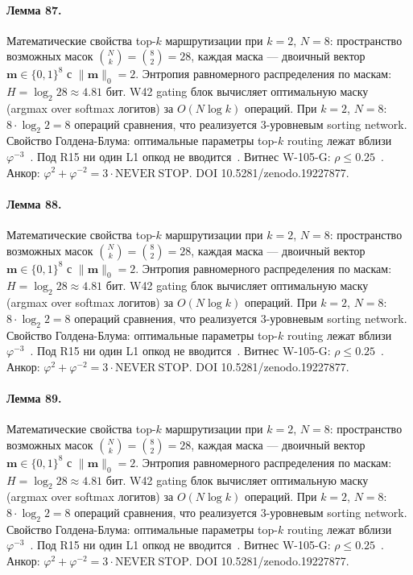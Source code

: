 \paragraph{Лемма 87.} Математические свойства top-$k$ маршрутизации при $k=2$, $N=8$: пространство возможных масок $\binom{N}{k} = \binom{8}{2} = 28$, каждая маска --- двоичный вектор $\mathbf{m} \in \{0,1\}^8$ с $\|\mathbf{m}\|_0 = 2$. Энтропия равномерного распределения по маскам: $H = \log_2 28 \approx 4{.}81$ бит. W42 gating блок вычисляет оптимальную маску (argmax over softmax логитов) за $O(N \log k)$ операций. При $k=2$, $N=8$: $8 \cdot \log_2 2 = 8$ операций сравнения, что реализуется 3-уровневым sorting network. Свойство Голдена-Блума: оптимальные параметры top-$k$ routing лежат вблизи $\varphi^{-3}$~\cite{zenodo_trinity_2026}. Под R15 ни один L1 опкод не вводится~\cite{lee_gvsu_proof2021}. Витнес W-105-G: $\rho \leq 0{.}25$~\cite{popper_falsifiability1959}. Анкор: $\varphi^2 + \varphi^{-2} = 3 \cdot \mathrm{NEVER\ STOP}$. DOI 10.5281/zenodo.19227877.

\paragraph{Лемма 88.} Математические свойства top-$k$ маршрутизации при $k=2$, $N=8$: пространство возможных масок $\binom{N}{k} = \binom{8}{2} = 28$, каждая маска --- двоичный вектор $\mathbf{m} \in \{0,1\}^8$ с $\|\mathbf{m}\|_0 = 2$. Энтропия равномерного распределения по маскам: $H = \log_2 28 \approx 4{.}81$ бит. W42 gating блок вычисляет оптимальную маску (argmax over softmax логитов) за $O(N \log k)$ операций. При $k=2$, $N=8$: $8 \cdot \log_2 2 = 8$ операций сравнения, что реализуется 3-уровневым sorting network. Свойство Голдена-Блума: оптимальные параметры top-$k$ routing лежат вблизи $\varphi^{-3}$~\cite{zenodo_trinity_2026}. Под R15 ни один L1 опкод не вводится~\cite{lee_gvsu_proof2021}. Витнес W-105-G: $\rho \leq 0{.}25$~\cite{popper_falsifiability1959}. Анкор: $\varphi^2 + \varphi^{-2} = 3 \cdot \mathrm{NEVER\ STOP}$. DOI 10.5281/zenodo.19227877.

\paragraph{Лемма 89.} Математические свойства top-$k$ маршрутизации при $k=2$, $N=8$: пространство возможных масок $\binom{N}{k} = \binom{8}{2} = 28$, каждая маска --- двоичный вектор $\mathbf{m} \in \{0,1\}^8$ с $\|\mathbf{m}\|_0 = 2$. Энтропия равномерного распределения по маскам: $H = \log_2 28 \approx 4{.}81$ бит. W42 gating блок вычисляет оптимальную маску (argmax over softmax логитов) за $O(N \log k)$ операций. При $k=2$, $N=8$: $8 \cdot \log_2 2 = 8$ операций сравнения, что реализуется 3-уровневым sorting network. Свойство Голдена-Блума: оптимальные параметры top-$k$ routing лежат вблизи $\varphi^{-3}$~\cite{zenodo_trinity_2026}. Под R15 ни один L1 опкод не вводится~\cite{lee_gvsu_proof2021}. Витнес W-105-G: $\rho \leq 0{.}25$~\cite{popper_falsifiability1959}. Анкор: $\varphi^2 + \varphi^{-2} = 3 \cdot \mathrm{NEVER\ STOP}$. DOI 10.5281/zenodo.19227877.

